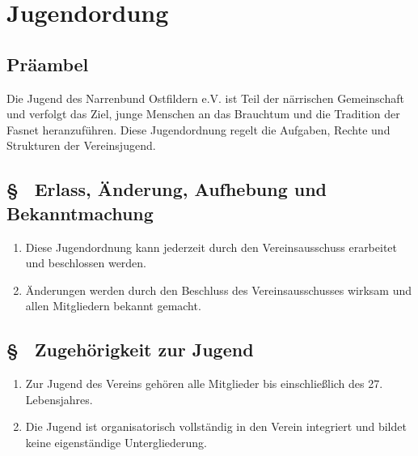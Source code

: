 \setcounter{joparagraphcounter}{1}

\section{Jugendordung}

\subsection{Präambel}
Die Jugend des Narrenbund Ostfildern e.V. ist Teil der närrischen Gemeinschaft und verfolgt das Ziel, junge Menschen an das Brauchtum und die Tradition der Fasnet heranzuführen. Diese Jugendordnung regelt die Aufgaben, Rechte und Strukturen der Vereinsjugend.

\subsection{§ \thejoparagraphcounter\ Erlass, Änderung, Aufhebung und Bekanntmachung} \label{jo:par:erlass_aenderung_aufhebung}
\begin{enumerate}
    \item \label{jo:abs:of1a22} Diese Jugendordnung kann jederzeit durch den Vereinsausschuss erarbeitet und beschlossen werden.

    \item \label{jo:abs:rqn6xb} Änderungen werden durch den Beschluss des Vereinsausschusses wirksam und allen Mitgliedern bekannt gemacht.
\end{enumerate}

\subsection{§ \thejoparagraphcounter\ Zugehörigkeit zur Jugend} \label{jo:par:zugehoerigkeit_jugend}
\begin{enumerate}
    \item \label{jo:abs:s1rqff} Zur Jugend des Vereins gehören alle Mitglieder bis einschließlich des 27. Lebensjahres.

    \item \label{jo:abs:eh777b} Die Jugend ist organisatorisch vollständig in den Verein integriert und bildet keine eigenständige Untergliederung.
\end{enumerate}

